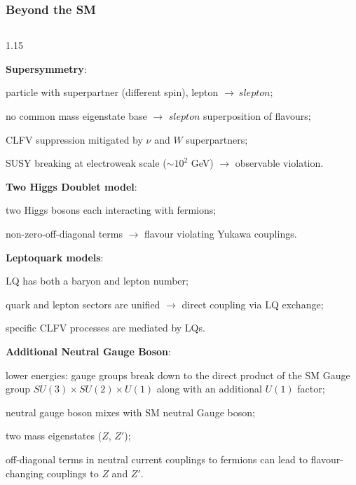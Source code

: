 \documentclass{beamer}
\begin{document}
\begin{frame}
    \frametitle{Beyond the SM}
    \vspace{-3mm}
  
        \begin{columns}
            \begin{column}{1.15\framewidth}
            \setlength{\leftmargini}{1.1em}
        \begin{itemize}
    {\footnotesize   \item  \textbf{Supersymmetry}:} 
    \begin{itemize}
        {\footnotesize \item particle with superpartner (different spin), lepton $\rightarrow \ slepton$;
        \item no common mass eigenstate base $\rightarrow$ 
        $slepton$ superposition of flavours;
        \item CLFV suppression mitigated by $\nu$ and $W$ superpartners;
        \item SUSY breaking at electroweak scale ($\sim 10^2$ GeV) $\rightarrow$ observable 
        violation. 
        }
    \end{itemize}
    {\footnotesize  \item \textbf{Two Higgs Doublet model}:}
    \begin{itemize}
        {\footnotesize  \item  two Higgs bosons each interacting with fermions;
        \item non-zero-off-diagonal terms $\rightarrow$ flavour violating Yukawa couplings.}
    \end{itemize}
    {\footnotesize  \item \textbf{Leptoquark models}:}
    \begin{itemize}
        {\footnotesize   \item LQ has both a baryon and lepton number; 
        \item quark and lepton sectors are unified $\rightarrow$ direct coupling via LQ exchange;
        \item specific CLFV processes are mediated by LQs.}

    \end{itemize}
    {\footnotesize  \item  \textbf{Additional Neutral Gauge Boson}: }
    \begin{itemize}
        {\footnotesize   
        \item lower energies: gauge groups break down to the 
        direct product of the SM Gauge group $SU(3) \times SU(2) \times U(1)$ 
        along with an additional $U(1)$ factor;
        \item neutral gauge boson mixes with SM neutral Gauge boson;
        \item two mass eigenstates ($Z$, $Z'$);
        \item off-diagonal terms in neutral current couplings 
        to fermions can lead to flavour-changing couplings to $Z$ and $Z'$.}


\end{itemize}
\end{itemize}
\end{column}
\end{columns}
\end{frame}
\end{document}
